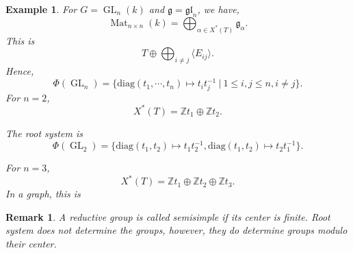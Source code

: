 \documentclass[10pt]{article}
\newtheorem{remark}{Remark}[section]
\newtheorem{example}{Example}[section]
\numberwithin{equation}{theorem}
\DeclareMathOperator{\GL}{GL}
\DeclareMathOperator{\Mat}{Mat}
\newcommand{\Z}[0]{\mathbb{Z}}
\newcommand{\g}[0]{\mathfrak{g}}
\newcommand{\diag}[0]{\mathrm{diag}}
\newcommand{\sep}[0]{\:|\:}
\begin{document}
\begin{example}
    For $G=\GL_n(k)$ and $\g = \mathfrak{gl}_n$, we have,
    \begin{equation*}
        \Mat_{n\times n}(k) = \bigoplus_{\alpha\in X^*(T)}\g_\alpha.
    \end{equation*}
    This is 
    \begin{equation*}
        T\oplus\bigoplus_{i\not=j}\langle E_{ij}\rangle.
    \end{equation*}
    Hence,
    \begin{equation*}
        \Phi(\GL_n) = \{\mathrm{diag}(t_1,\cdots,t_n)\mapsto t_it_j^{-1}\sep 1\leq i,j\leq n,i\not=j\}.
    \end{equation*}
    For $n=2$, 
    \begin{equation*}
        X^*(T) = \Z t_1\oplus \Z t_2.
    \end{equation*}

    The root system is 
    \begin{equation*}
        \Phi(\GL_2) = \{\diag(t_1,t_2)\mapsto t_1t_2^{-1},\diag(t_1,t_2)\mapsto t_2t_1^{-1}\}.
    \end{equation*}
    \begin{center}
    \end{center}
    For $n=3$, 
    \begin{equation*}
        X^*(T) = \Z t_1\oplus \Z t_2\oplus \Z t_3.
    \end{equation*}
    In a graph, this is
        \begin{center}
    \end{center}
\end{example}

\begin{remark}
    A reductive group is called semisimple if its center is finite. Root system does not determine the groups, however, they do determine groups modulo their center.
\end{remark}
\end{document}
